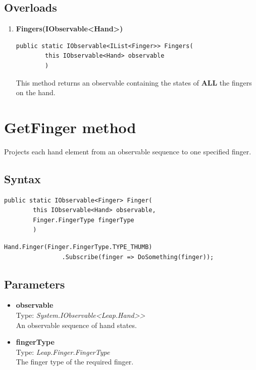 \documentclass[12pt,a4paper,twoside]{report}
\begin{document}
\subsection{Overloads}
\begin{enumerate}
    \item \textbf{Fingers(IObservable<Hand>)}\\
\begin{lstlisting}[caption=Declaration]
    public static IObservable<IList<Finger>> Fingers(
        this IObservable<Hand> observable
        )
\end{lstlisting}

This method returns an observable containing the states of \textbf{ALL} the fingers on the hand.
\end{enumerate}

\section{GetFinger method}
Projects each hand element from an observable sequence to one specified finger.

\subsection{Syntax}
\begin{lstlisting}[caption=Declaration]
     public static IObservable<Finger> Finger(
        this IObservable<Hand> observable,
        Finger.FingerType fingerType
        )
\end{lstlisting}

\begin{lstlisting}[caption=Usage example]
     Hand.Finger(Finger.FingerType.TYPE_THUMB)
                .Subscribe(finger => DoSomething(finger));
\end{lstlisting}

\subsection{Parameters}
\begin{itemize}
    \item \textbf{observable}\\
        Type: \textit{System.IObservable<Leap.Hand>{}>}\\
        An observable sequence of hand states.
    \item \textbf{fingerType}\\
        Type: \textit{Leap.Finger.FingerType}\\
        The finger type of the required finger.
\end{itemize}
\end{document}
